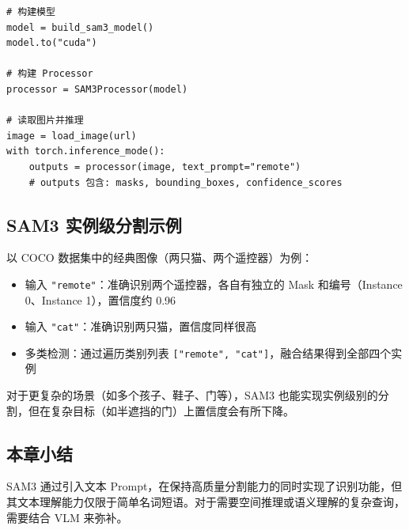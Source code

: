 \begin{lstlisting}[caption={SAM3 基本使用示例（伪代码）}]
# 构建模型
model = build_sam3_model()
model.to("cuda")

# 构建 Processor
processor = SAM3Processor(model)

# 读取图片并推理
image = load_image(url)
with torch.inference_mode():
    outputs = processor(image, text_prompt="remote")
    # outputs 包含: masks, bounding_boxes, confidence_scores
\end{lstlisting}

\subsection{SAM3 实例级分割示例}

以 COCO 数据集中的经典图像（两只猫、两个遥控器）为例：

\begin{itemize}
    \item 输入 \texttt{"remote"}：准确识别两个遥控器，各自有独立的 Mask 和编号（Instance 0、Instance 1），置信度约 0.96
    \item 输入 \texttt{"cat"}：准确识别两只猫，置信度同样很高
    \item 多类检测：通过遍历类别列表 \texttt{{[}"remote", "cat"{]}}，融合结果得到全部四个实例
\end{itemize}

对于更复杂的场景（如多个孩子、鞋子、门等），SAM3 也能实现实例级别的分割，但在复杂目标（如半遮挡的门）上置信度会有所下降。

\subsection{本章小结}

SAM3 通过引入文本 Prompt，在保持高质量分割能力的同时实现了识别功能，但其文本理解能力仅限于简单名词短语。对于需要空间推理或语义理解的复杂查询，需要结合 VLM 来弥补。


